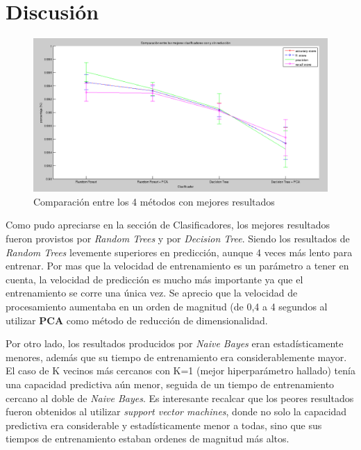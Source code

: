 \documentclass{article}
\begin{document}
\section{Discusión}

\begin{figure}[H] %
\begin{center}
\includegraphics[width=500pt]{compararMetodos.png}
\caption{Comparación entre los 4 métodos con mejores resultados}
\label{compararMetodos}
\end{center}
\end{figure}

Como pudo apreciarse en la sección de Clasificadores, los mejores resultados fueron provistos por \textit{Random Trees} y por \textit{Decision Tree}. Siendo los resultados de \textit{Random Trees} levemente superiores en predicción, aunque 4 veces más lento para entrenar. Por mas que la velocidad de entrenamiento es un parámetro a tener en cuenta, la velocidad de predicción es mucho más importante ya que el entrenamiento se corre una única vez. Se aprecio que la velocidad de procesamiento aumentaba en un orden de magnitud (de 0,4 a 4 segundos al utilizar \textbf{PCA} como método de reducción de dimensionalidad.

Por otro lado, los resultados producidos por \textit{Naive Bayes} eran estadísticamente menores, además que su tiempo de entrenamiento era considerablemente mayor. El caso de K vecinos más cercanos con K=1 (mejor hiperparámetro hallado) tenía una capacidad predictiva aún menor, seguida de un tiempo de entrenamiento cercano al doble de \textit{Naive Bayes}. Es interesante recalcar que los peores resultados fueron obtenidos al utilizar \textit{support vector machines}, donde no solo la capacidad predictiva era considerable y estadísticamente menor a todas, sino que sus tiempos de entrenamiento estaban ordenes de magnitud más altos.
\end{document}
